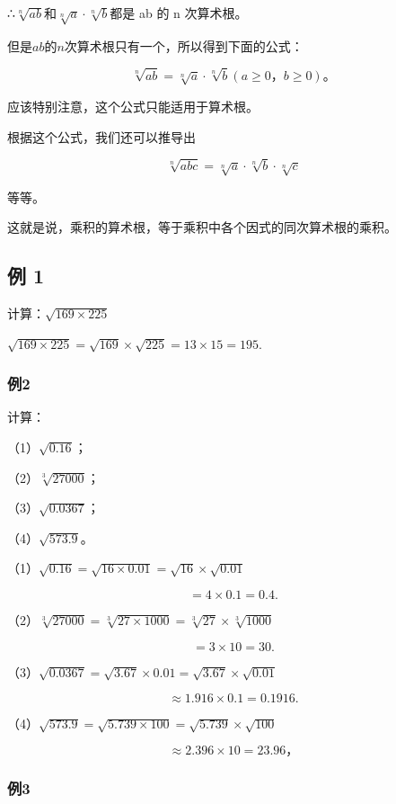 ∴\(\sqrt[n]{ab}\)和\(\sqrt[n]{a} \cdot \sqrt[n]{b}\)都是 ab 的 n
次算术根。

但是\(ab\)的\(n\)次算术根只有一个，所以得到下面的公式：

\[
\sqrt[n]{a b} = \sqrt[n]{a} \cdot \sqrt[n]{b} (a \geqslant 0\text{，} b \geqslant 0)\text{。}
\]

应该特别注意，这个公式只能适用于算术根。

根据这个公式，我们还可以推导出

\[
\sqrt[n]{a b c} = \sqrt[n]{a} \cdot \sqrt[n]{b} \cdot \sqrt[n]{c}
\]

等等。

这就是说，乘积的算术根，等于乘积中各个因式的同次算术根的乘积。

\subsection{例 1}

计算：\(\sqrt{169\times225}\)

\(\sqrt{169\times 225} = \sqrt{169}\times \sqrt{225} = 13\times 15 = 195.\)

\subsubsection{例2}

计算：

（1）\(\sqrt{0.16}\)；

（2）\(\sqrt[3]{27000}\)；

（3）\(\sqrt{0.0367}\)；

（4）\(\sqrt{573.9}\)。

（1）\(\sqrt{0.16} = \sqrt{16 \times 0.01} = \sqrt{16} \times \sqrt{0.01}\)

\[
= 4 \times 0.1 = 0.4.
\]

（2）\(\sqrt[3]{27000} = \sqrt[3]{27 \times 1000} = \sqrt[3]{27} \times \sqrt[3]{1000}\)

\[
= 3 \times 10 = 30.
\]

（3）\(\sqrt{0.0367} = \sqrt{3.67} \times 0.01 = \sqrt{3.67} \times \sqrt{0.01}\)

\[
\approx 1.916 \times 0.1 = 0.1916.
\]

（4）\(\sqrt{573.9} = \sqrt{5.739 \times 100} = \sqrt{5.739} \times \sqrt{100}\)

\[
\approx 2.396 \times 10 = 23.96\text{，}
\]

\subsubsection{例3}

